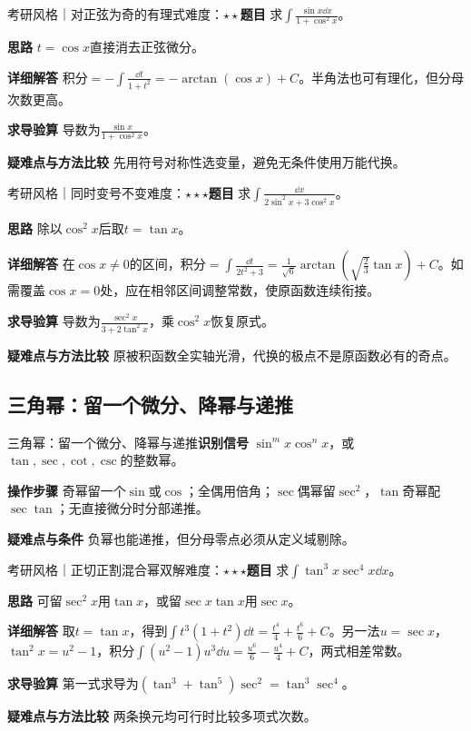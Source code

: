 \begin{example}{考研风格｜对正弦为奇的有理式}{难度：$\star\star$}\label{ic:ex:indefinite_classical_complete:sinodd}\textbf{题目} 求$\int\frac{\sin x\dd x}{1+\cos^2x}$。\par \textbf{思路} $t=\cos x$直接消去正弦微分。\par \textbf{详细解答} 积分$=-\int\frac{\dd t}{1+t^2}=-\arctan(\cos x)+C$。半角法也可有理化，但分母次数更高。\par \textbf{求导验算} 导数为$\frac{\sin x}{1+\cos^2x}$。\par \textbf{疑难点与方法比较} 先用符号对称性选变量，避免无条件使用万能代换。\end{example}

\begin{example}{考研风格｜同时变号不变}{难度：$\star\star\star$}\label{ic:ex:indefinite_classical_complete:simultaneous}\textbf{题目} 求$\int\frac{\dd x}{2\sin^2x+3\cos^2x}$。\par \textbf{思路} 除以$\cos^2x$后取$t=\tan x$。\par \textbf{详细解答} 在$\cos x\ne0$的区间，积分$=\int\frac{\dd t}{2t^2+3}=\frac1{\sqrt6}\arctan(\sqrt{\frac{2}{3}}\tan x)+C$。如需覆盖$\cos x=0$处，应在相邻区间调整常数，使原函数连续衔接。\par \textbf{求导验算} 导数为$\frac{\sec^2x}{3+2\tan^2x}$，乘$\cos^2x$恢复原式。\par \textbf{疑难点与方法比较} 原被积函数全实轴光滑，代换的极点不是原函数必有的奇点。\end{example}

\subsection{三角幂：留一个微分、降幂与递推}\label{ic:indefinite_classical_complete:trigpowers}\begin{method}{三角幂：留一个微分、降幂与递推}\textbf{识别信号} $\sin^mx\cos^nx$，或$\tan,\sec,\cot,\csc$的整数幂。\par \textbf{操作步骤} 奇幂留一个$\sin$或$\cos$；全偶用倍角；$\sec$偶幂留$\sec^2$，$\tan$奇幂配$\sec\tan$；无直接微分时分部递推。\par \textbf{疑难点与条件} 负幂也能递推，但分母零点必须从定义域剔除。\end{method}

\begin{example}{考研风格｜正切正割混合幂双解}{难度：$\star\star\star$}\label{ic:ex:indefinite_classical_complete:tansecpower}\textbf{题目} 求$\int\tan^3x\sec^4x\dd x$。\par \textbf{思路} 可留$\sec^2x$用$\tan x$，或留$\sec x\tan x$用$\sec x$。\par \textbf{详细解答} 取$t=\tan x$，得到$\int t^3(1+t^2)\dd t=\frac{t^4}{4}+\frac{t^6}{6}+C$。另一法$u=\sec x$，$\tan^2x=u^2-1$，积分$\int(u^2-1)u^3\dd u=\frac{u^6}{6}-\frac{u^4}{4}+C$，两式相差常数。\par \textbf{求导验算} 第一式求导为$(\tan^3+\tan^5)\sec^2=\tan^3\sec^4$。\par \textbf{疑难点与方法比较} 两条换元均可行时比较多项式次数。\end{example}

